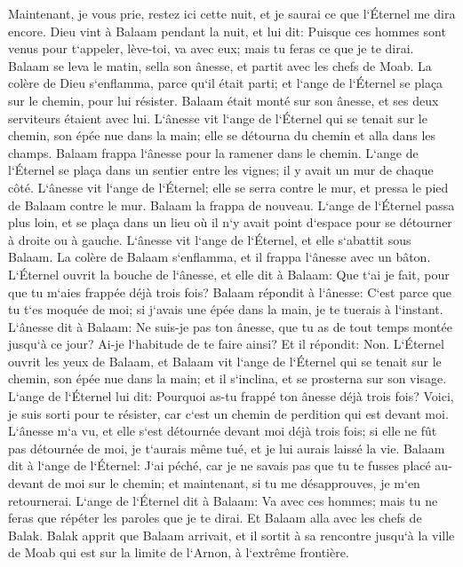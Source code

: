 \verse Maintenant, je vous prie, restez ici cette nuit, et je saurai ce que l`Éternel me dira encore. 
\verse Dieu vint à Balaam pendant la nuit, et lui dit: Puisque ces hommes sont venus pour t`appeler, lève-toi, va avec eux; mais tu feras ce que je te dirai. 
\verse Balaam se leva le matin, sella son ânesse, et partit avec les chefs de Moab. 
\verse La colère de Dieu s`enflamma, parce qu`il était parti; et l`ange de l`Éternel se plaça sur le chemin, pour lui résister. Balaam était monté sur son ânesse, et ses deux serviteurs étaient avec lui. 
\verse L`ânesse vit l`ange de l`Éternel qui se tenait sur le chemin, son épée nue dans la main; elle se détourna du chemin et alla dans les champs. Balaam frappa l`ânesse pour la ramener dans le chemin. 
\verse L`ange de l`Éternel se plaça dans un sentier entre les vignes; il y avait un mur de chaque côté. 
\verse L`ânesse vit l`ange de l`Éternel; elle se serra contre le mur, et pressa le pied de Balaam contre le mur. Balaam la frappa de nouveau. 
\verse L`ange de l`Éternel passa plus loin, et se plaça dans un lieu où il n`y avait point d`espace pour se détourner à droite ou à gauche. 
\verse L`ânesse vit l`ange de l`Éternel, et elle s`abattit sous Balaam. La colère de Balaam s`enflamma, et il frappa l`ânesse avec un bâton. 
\verse L`Éternel ouvrit la bouche de l`ânesse, et elle dit à Balaam: Que t`ai je fait, pour que tu m`aies frappée déjà trois fois? 
\verse Balaam répondit à l`ânesse: C`est parce que tu t`es moquée de moi; si j`avais une épée dans la main, je te tuerais à l`instant. 
\verse L`ânesse dit à Balaam: Ne suis-je pas ton ânesse, que tu as de tout temps montée jusqu`à ce jour? Ai-je l`habitude de te faire ainsi? Et il répondit: Non. 
\verse L`Éternel ouvrit les yeux de Balaam, et Balaam vit l`ange de l`Éternel qui se tenait sur le chemin, son épée nue dans la main; et il s`inclina, et se prosterna sur son visage. 
\verse L`ange de l`Éternel lui dit: Pourquoi as-tu frappé ton ânesse déjà trois fois? Voici, je suis sorti pour te résister, car c`est un chemin de perdition qui est devant moi. 
\verse L`ânesse m`a vu, et elle s`est détournée devant moi déjà trois fois; si elle ne fût pas détournée de moi, je t`aurais même tué, et je lui aurais laissé la vie. 
\verse Balaam dit à l`ange de l`Éternel: J`ai péché, car je ne savais pas que tu te fusses placé au-devant de moi sur le chemin; et maintenant, si tu me désapprouves, je m`en retournerai. 
\verse L`ange de l`Éternel dit à Balaam: Va avec ces hommes; mais tu ne feras que répéter les paroles que je te dirai. Et Balaam alla avec les chefs de Balak. 
\verse Balak apprit que Balaam arrivait, et il sortit à sa rencontre jusqu`à la ville de Moab qui est sur la limite de l`Arnon, à l`extrême frontière. 
